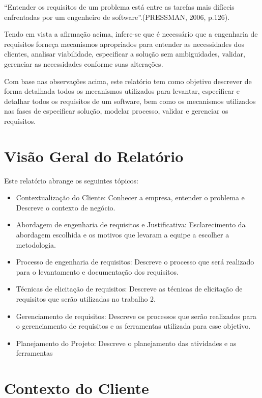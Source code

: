 “Entender os requisitos de um problema está entre as tarefas mais difíceis enfrentadas por um engenheiro de software”.(PRESSMAN, 2006, p.126).

Tendo em vista a afirmação acima, infere-se que é necessário que a engenharia de requisitos forneça mecanismos apropriados para entender as necessidades dos clientes, analisar viabilidade, especificar a solução sem ambiguidades, validar, gerenciar as necessidades conforme suas alterações.

Com base nas observações acima, este relatório tem como objetivo descrever de forma detalhada todos os mecanismos utilizados para levantar, especificar e detalhar todos os requisitos de um software, bem como os mecanismos utilizados nas fases de especificar solução, modelar processo, validar e gerenciar os requisitos.


\section {Visão Geral do Relatório}

Este relatório abrange os seguintes tópicos:

\begin{itemize}
\item Contextualização do Cliente: Conhecer a empresa, entender o problema e Descreve o contexto de negócio.
\item Abordagem de engenharia de requisitos e Justificativa: Esclarecimento da abordagem escolhida e os motivos que levaram a equipe a escolher a metodologia.
\item Processo de engenharia de requisitos: Descreve o processo que será realizado para o levantamento e documentação dos requisitos.
\item Técnicas de elicitação de requisitos: Descreve as técnicas de elicitação de requisitos que serão utilizadas no trabalho 2.
\item Gerenciamento de requisitos: Descreve os processos que serão realizados para o gerenciamento de requisitos e as ferramentas utilizada para esse objetivo.
\item Planejamento do Projeto: Descreve o planejamento das atividades e as ferramentas
\end{itemize}

\section {Contexto do Cliente}

